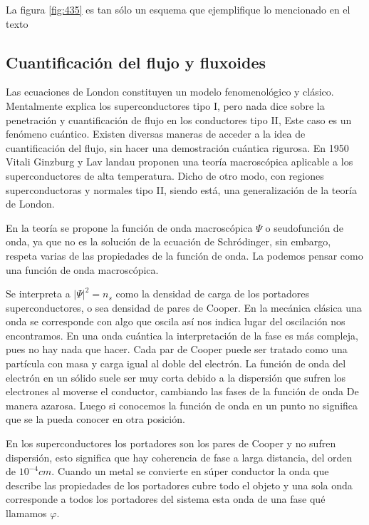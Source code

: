 La figura \ref{fig:435} es tan sólo un esquema que ejemplifique lo mencionado en el texto


\subsection{Cuantificación del flujo y fluxoides}

Las ecuaciones de London constituyen un modelo fenomenológico y clásico. Mentalmente explica los superconductores tipo I, pero nada dice sobre la penetración y cuantificación de flujo en los conductores tipo II, Este caso es un fenómeno cuántico. Existen diversas maneras de acceder a la idea de cuantificación del flujo, sin hacer una demostración cuántica rigurosa. En 1950 Vitali Ginzburg y Lav landau proponen una teoría macroscópica aplicable a los superconductores de alta temperatura. Dicho de otro modo, con regiones superconductoras y normales tipo II, siendo está, una generalización de la teoría de London.

En la teoría se propone la función de onda macroscópica $\Psi$ o seudofunción de onda, ya que no es la solución de la ecuación de Schródinger, sin embargo, respeta varias de las propiedades de la función de onda. La podemos pensar como una función de onda macroscópica.

Se interpreta a $\vert \Psi  \vert^{2}=n_{s}$ como la densidad de carga de los portadores superconductores, o sea densidad de pares de Cooper. En la mecánica clásica una onda se corresponde con algo que oscila así nos indica lugar del oscilación nos encontramos. En una onda cuántica la interpretación de la fase es más compleja, pues no hay nada que hacer. Cada par de Cooper puede ser tratado como una partícula con masa y carga igual al doble del electrón. La función de onda del electrón en un sólido suele ser muy corta debido a la dispersión que sufren los electrones al moverse el conductor, cambiando las fases de la función de onda De manera azarosa. Luego si conocemos la función de onda en un punto no significa que se la pueda conocer en otra posición.

En los superconductores los portadores son los pares de Cooper y no sufren dispersión, esto significa que hay coherencia de fase a larga distancia, del orden de $10^{-4}cm$. Cuando un metal se convierte en súper conductor la onda que describe las propiedades de los portadores cubre todo el objeto y una sola onda corresponde a todos los portadores del sistema esta onda de una fase qué llamamos $\varphi$.

